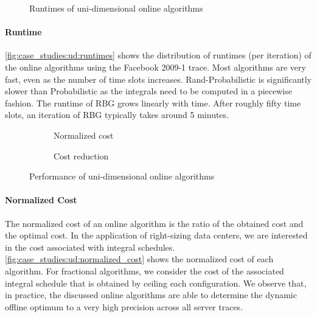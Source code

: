 \begin{figure}
    \begin{subfigure}[b]{.5\linewidth}
    \resizebox{\textwidth}{!}{}
    \end{subfigure}
    \begin{subfigure}[b]{.5\linewidth}
    \resizebox{\textwidth}{!}{}
    \end{subfigure}
    \caption{Runtimes of uni-dimensional online algorithms}\label{fig:case_studies:ud:runtimes}
\end{figure}

\paragraph{Runtime} \autoref{fig:case_studies:ud:runtimes} shows the distribution of runtimes (per iteration) of the online algorithms using the Facebook 2009-1 trace. Most algorithms are very fast, even as the number of time slots increases. Rand-Probabilistic is significantly slower than Probabilistic as the integrals need to be computed in a piecewise fashion. The runtime of RBG grows linearly with time. After roughly fifty time slots, an iteration of RBG typically takes around 5 minutes.

\begin{figure}
    \begin{subfigure}[b]{.5\linewidth}
    \resizebox{\textwidth}{!}{}
    \caption{Normalized cost}\label{fig:case_studies:ud:normalized_cost}
    \end{subfigure}
    \begin{subfigure}[b]{.5\linewidth}
    \resizebox{\textwidth}{!}{}
    \caption{Cost reduction}\label{fig:case_studies:ud:cost_reduction}
    \end{subfigure}
    \caption{Performance of uni-dimensional online algorithms}
\end{figure}

\paragraph{Normalized Cost} The normalized cost of an online algorithm is the ratio of the obtained cost and the optimal cost. In the application of right-sizing data centers, we are interested in the cost associated with integral schedules. \autoref{fig:case_studies:ud:normalized_cost} shows the normalized cost of each algorithm. For fractional algorithms, we consider the cost of the associated integral schedule that is obtained by ceiling each configuration. We observe that, in practice, the discussed online algorithms are able to determine the dynamic offline optimum to a very high precision across all server traces.

